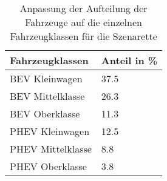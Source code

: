 {
\renewcommand{\arraystretch}{1.2}%
\begin{table}[H]
	\begin{center}
		\caption{Anpassung der Aufteilung der Fahrzeuge auf die einzelnen Fahrzeugklassen für die Szenarette}
		\begin{tabu} to 0.6\textwidth {X[1] X[1, r]}
			\hline
			Fahrzeugklassen   & Anteil in \si{\percent} \\ \hline
			BEV Kleinwagen    & \num{37.5}              \\
			BEV Mittelklasse  & \num{26.3}              \\
			BEV Oberklasse    & \num{11.3}              \\
			PHEV Kleinwagen   & \num{12.5}              \\
			PHEV Mittelklasse & \num{8.8}               \\
			PHEV Oberklasse   & \num{3.8}               \\ \hline
		\end{tabu}
		\label{tab:CarSplitSzenarette}
	\end{center}
	\vspace{-3mm}%
\end{table}
}